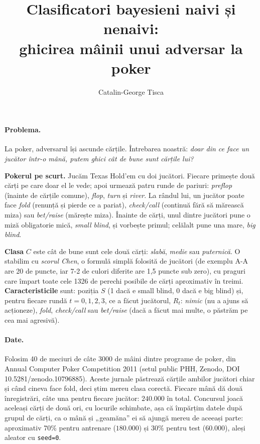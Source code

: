 \documentclass[10pt,a4paper]{article}
\title{\vspace{-1.2cm}Clasificatori bayesieni naivi și nenaivi:\\
ghicirea mâinii unui adversar la poker\vspace{-0.3cm}}
\author{Catalin-George Tisca}
\date{\vspace{-0.6cm}}
\begin{document}
\maketitle

\paragraph{Problema.} La poker, adversarul își ascunde cărțile. Întrebarea
noastră: \emph{doar din ce face un jucător într-o mână, putem ghici cât de bune
sunt cărțile lui?}

\textbf{Pokerul pe scurt.} Jucăm Texas Hold'em cu doi jucători. Fiecare
primește două cărți pe care doar el le vede; apoi urmează patru runde de
pariuri: \emph{preflop} (înainte de cărțile comune), \emph{flop}, \emph{turn}
și \emph{river}. La rândul lui, un jucător poate face \emph{fold} (renunță și
pierde ce a pariat), \emph{check/call} (continuă fără să mărească miza) sau
\emph{bet/raise} (mărește miza). Înainte de cărți, unul dintre jucători pune o
miză obligatorie mică, \emph{small blind}, și vorbește primul; celălalt pune
una mare, \emph{big blind}.

\textbf{Clasa} $C$ este cât de bune sunt cele două cărți: \emph{slabă},
\emph{medie} sau \emph{puternică}. O stabilim cu \emph{scorul Chen}, o formulă
simplă folosită de jucători (de exemplu A-A are 20 de puncte, iar 7-2 de culori
diferite are 1,5 puncte sub zero), cu praguri care împart toate cele 1326 de perechi posibile
de cărți aproximativ în treimi. \textbf{Caracteristicile} sunt: poziția $S$
(1 dacă e small blind, 0 dacă e big blind) și, pentru fiecare rundă $t=0,1,2,3$, ce a făcut
jucătorul, $R_t$: \emph{nimic} (nu a ajuns să acționeze), \emph{fold},
\emph{check/call} sau \emph{bet/raise} (dacă a făcut mai multe, o păstrăm pe
cea mai agresivă).

\paragraph{Date.} Folosim 40 de meciuri de câte 3000 de mâini dintre programe
de poker, din Annual Computer Poker Competition 2011 (setul public PHH, Zenodo,
DOI 10.5281/zenodo.10796885). Aceste jurnale păstrează cărțile ambilor
jucători chiar și când cineva face fold, deci știm mereu clasa corectă. Fiecare
mână dă două înregistrări, câte una pentru fiecare jucător: $240{.}000$ în
total. Concursul joacă aceleași cărți de două ori, cu locurile schimbate, așa
că împărțim datele după grupul de cărți, ca o mână și „geamăna'' ei să ajungă
mereu de aceeași parte: aproximativ 70\% pentru antrenare ($180{.}000$) și
30\% pentru test ($60{.}000$), aleși aleator cu \texttt{seed=0}.
\end{document}
